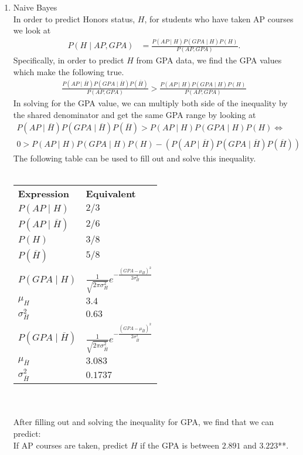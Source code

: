 \documentclass[12pt]{article}
\begin{document}
\begin{enumerate}
  	\item Naive Bayes \\
  		In order to predict Honors status, $H$, for students who have taken AP courses we look at 
  		\begin{align*}
  			P(H \mid AP, GPA) &= \frac{P(AP \mid H) P(GPA \mid H) P(H)}{P(AP,GPA)}.
  		\end{align*}
  		Specifically, in order to predict $H$ from GPA data, we find the GPA values which make the following true.
  		\begin{align*}
  		\frac{P(AP \mid \overline{H}) P(GPA \mid \overline{H}) P(\overline{H})}{P(AP,GPA)} > \frac{P(AP \mid H) P(GPA \mid H) P(H)}{P(AP,GPA)}
  		\end{align*} 
  		In solving for the GPA value, we can multiply both side of the inequality by the shared denominator and get the same GPA range by looking at 
  		\begin{align*}
  		P(AP \mid \overline{H}) P(GPA \mid \overline{H}) P(\overline{H}) > P(AP \mid H) P(GPA \mid H) P(H) \Longleftrightarrow \\
  		0 > P(AP \mid H) P(GPA \mid H) P(H) - \left( P(AP \mid \overline{H}) P(GPA \mid \overline{H}) P(\overline{H}) \right) 
  		\end{align*}
  		The following table can be used to fill out and solve this inequality.\\ \\
  		\begin{tabular}{l l}
  			\textbf{Expression} & \textbf{Equivalent} \\
  			$P(AP \mid H)$ & $2/3$ \\
  			$P(AP \mid \overline{H})$ & $2/6$ \\
  			$P(H)$ & $3/8$ \\
  			$P(\overline{H})$ & $5/8$ \\
  			$P(GPA \mid H)$ & $\frac{1}{\sqrt{2\pi\sigma_{H}^2}} e^{- \frac{(GPA - \mu_{H})^2}{2\sigma_{H}^2}} $ \\  	
  			$\mu_{H}$ & $3.4$ \\		
  			$\sigma_{H}^2$ & $0.63$ \\
  			$P(GPA \mid \overline{H})$ & $\frac{1}{\sqrt{2\pi\sigma_{\overline{H}}^2}} e^{- \frac{(GPA - \mu_{\overline{H}})^2}{2\sigma_{\overline{H}}^2}} $ \\
  			$\mu_{\overline{H}}$ & $3.083$ \\
  			$\sigma_{\overline{H}}^2$ & $0.1737$ \\
  		\end{tabular} \\ \\
  		After filling out and solving the inequality for GPA, we find that we can predict: \\
  		If AP courses are taken, predict $H$ if the GPA is between $2.891$ and $3.223$**. \\ \\
  		

\end{enumerate}
\end{document}

